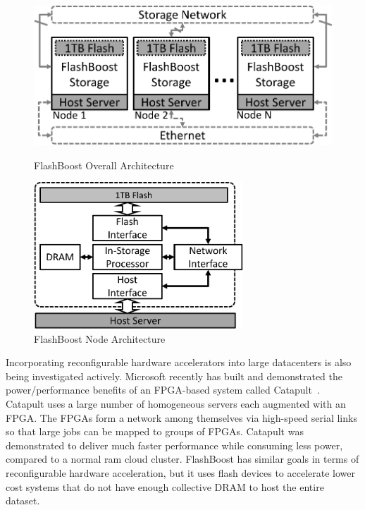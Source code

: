 \begin{figure}[t!]
\centering
\vspace{0pt}
\begin{minipage}[c]{.4\paperwidth}
\begin{center}
	\includegraphics[width=\textwidth]{figures/architecture_small-crop.pdf}
	\caption{FlashBoost Overall Architecture}
	\label{fig:architecture}
\end{center}
\end{minipage}\hfill
\vspace{0pt}
\begin{minipage}[c]{.4\paperwidth}
\begin{center}
	\includegraphics[width=0.7\textwidth]{figures/architecture_node-crop.pdf}
	\caption{FlashBoost Node Architecture}
	\label{fig:architecture_node}
\end{center}
\end{minipage}
\end{figure}



Incorporating reconfigurable hardware accelerators into large datacenters is also being investigated actively. Microsoft recently has built and
demonstrated the power/performance benefits of an FPGA-based system called
Catapult~\cite{msr_catapult}.  Catapult uses a large number of homogeneous
servers each augmented with an FPGA.  The FPGAs form a network among themselves
via high-speed serial links so that large jobs can be mapped to groups of FPGAs.
Catapult was demonstrated to deliver much faster performance while consuming
less power, compared to a normal ram cloud cluster. FlashBoost has similar
goals in terms of reconfigurable hardware acceleration, but it uses flash
devices to accelerate lower cost systems that do not have enough collective DRAM
to host the entire dataset.

